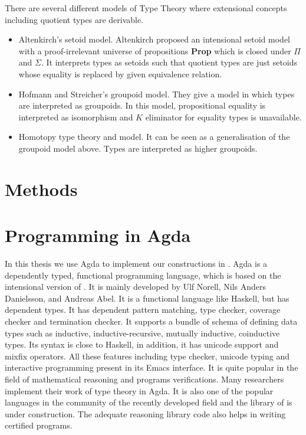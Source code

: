 There are several different models of Type Theory where extensional concepts including quotient types are derivable.

\begin{itemize}

\item Altenkirch's setoid model. Altenkirch \cite{alti:lics99} proposed an intensional setoid model
with a proof-irrelevant universe of propositions \textbf{Prop} which
is closed under $\Pi$ and $\Sigma$. It interprets types as setoids
such that quotient types are just setoids whose equality is replaced
by given equivalence relation.

\item Hofmann and Streicher's groupoid model. They give a model in which
types are interpreted as groupoids. In this model, propositional
equality is interpreted as isomorphism and $K$ eliminator for equality
types is unavailable. 

\item Homotopy type theory and \wog model. It can be seen as a
generalisation of the groupoid model above. Types are interpreted as
higher groupoids.

\end{itemize}

\section{Methods}




\section{Programming in Agda}

In this thesis we use Agda to implement our constructions in \itt. 
Agda is a dependently typed, functional programming language, which is
based on the intensional version of \mltt. It is mainly developed by
Ulf Norell, Nils Anders Danielsson, and Andreas Abel.
It is a functional language like Haskell, but has dependent types. It has dependent pattern
matching, type checker, coverage checker and termination checker. It
supports a bundle of schema of defining data types such as inductive, inductive-recursive, mutually inductive,
coinductive types. Its syntax is close to Haskell, in addition, it has
unicode support and mixfix operators. All these features including
type checker, unicode typing and interactive programming present in
its Emacs interface. It is quite popular in the field of mathematical reasoning and programs
verifications. Many researchers implement their work of type theory in
Agda. It is also one of the popular languages in the community of the recently
developed field \hott and the library of \hott is under construction.
The adequate reasoning library code also helps in writing certified programs.

